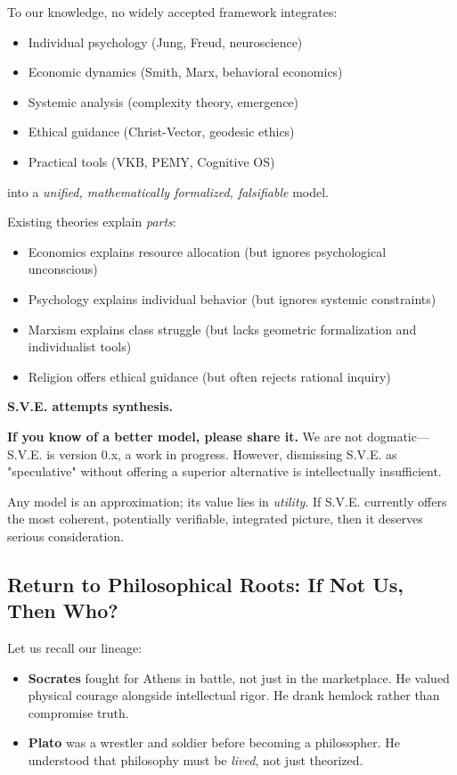 \documentclass[11pt,a4paper]{article}
\theoremstyle{definition}
\theoremstyle{remark}
\begin{document}
To our knowledge, no widely accepted framework integrates:
\begin{itemize}
\item Individual psychology (Jung, Freud, neuroscience)
\item Economic dynamics (Smith, Marx, behavioral economics)
\item Systemic analysis (complexity theory, emergence)
\item Ethical guidance (Christ-Vector, geodesic ethics)
\item Practical tools (VKB, PEMY, Cognitive OS)
\end{itemize}
into a \textit{unified, mathematically formalized, falsifiable} model.

Existing theories explain \textit{parts}:
\begin{itemize}
\item Economics explains resource allocation (but ignores psychological unconscious)
\item Psychology explains individual behavior (but ignores systemic constraints)
\item Marxism explains class struggle (but lacks geometric formalization and individualist tools)
\item Religion offers ethical guidance (but often rejects rational inquiry)
\end{itemize}

\textbf{S.V.E. attempts synthesis.}

\textbf{If you know of a better model, please share it.} We are not dogmatic—S.V.E. is version 0.x, a work in progress. However, dismissing S.V.E. as "speculative" without offering a superior alternative is intellectually insufficient.

Any model is an approximation; its value lies in \textit{utility}. If S.V.E. currently offers the most coherent, potentially verifiable, integrated picture, then it deserves serious consideration.

\subsection{Return to Philosophical Roots: If Not Us, Then Who?}

Let us recall our lineage:

\begin{itemize}
\item \textbf{Socrates} fought for Athens in battle, not just in the marketplace. He valued physical courage alongside intellectual rigor. He drank hemlock rather than compromise truth.
\item \textbf{Plato} was a wrestler and soldier before becoming a philosopher. He understood that philosophy must be \textit{lived}, not just theorized.
\end{itemize}
\end{document}
